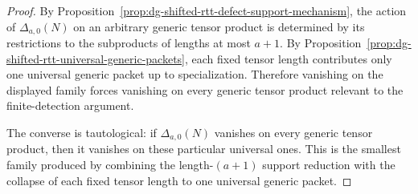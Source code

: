 \begin{proof}
By
Proposition~\ref{prop:dg-shifted-rtt-defect-support-mechanism},
the action of $\Delta_{a,0}(N)$ on an arbitrary generic tensor product
is determined by its restrictions to the subproducts of lengths at most
$a+1$.  By
Proposition~\ref{prop:dg-shifted-rtt-universal-generic-packets}, each
fixed tensor length contributes only one universal generic packet up to
specialization.  Therefore vanishing on the displayed family forces
vanishing on every generic tensor product relevant to the
finite-detection argument.

The converse is tautological: if $\Delta_{a,0}(N)$ vanishes on every
generic tensor product, then it vanishes on these particular universal
ones.  This is the smallest family produced by combining the
length-$(a+1)$ support reduction with the collapse of each fixed tensor
length to one universal generic packet.
\end{proof}


